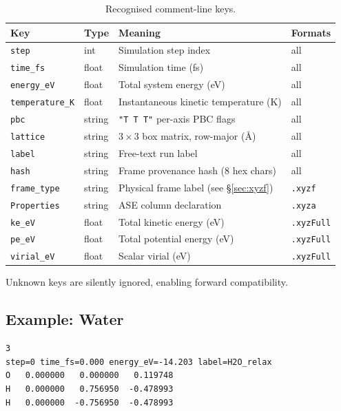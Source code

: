 \documentclass[11pt, a4paper, oneside]{article}
\begin{document}
\begin{table}[h]
\centering
\begin{tabular}{llll}
  \toprule
  Key & Type & Meaning & Formats \\
  \midrule
  \texttt{step}            & int    & Simulation step index & all \\
  \texttt{time\_fs}        & float  & Simulation time (fs)  & all \\
  \texttt{energy\_eV}      & float  & Total system energy (eV) & all \\
  \texttt{temperature\_K}  & float  & Instantaneous kinetic temperature (K) & all \\
  \texttt{pbc}             & string & \texttt{"T T T"} per-axis PBC flags & all \\
  \texttt{lattice}         & string & $3\times3$ box matrix, row-major (\AA) & all \\
  \texttt{label}           & string & Free-text run label & all \\
  \texttt{hash}            & string & Frame provenance hash (8 hex chars) & all \\
  \texttt{frame\_type}     & string & Physical frame label (see \S\ref{sec:xyzf}) & \texttt{.xyzf} \\
  \texttt{Properties}      & string & ASE column declaration & \texttt{.xyza} \\
  \texttt{ke\_eV}          & float  & Total kinetic energy (eV) & \texttt{.xyzFull} \\
  \texttt{pe\_eV}          & float  & Total potential energy (eV) & \texttt{.xyzFull} \\
  \texttt{virial\_eV}      & float  & Scalar virial (eV) & \texttt{.xyzFull} \\
  \bottomrule
\end{tabular}
\caption{Recognised comment-line keys.}
\label{tab:comment_keys}
\end{table}

Unknown keys are silently ignored, enabling forward compatibility.

\subsection{Example: Water}
\label{sec:xyz_example}

\begin{lstlisting}[caption={Minimal water molecule (\texttt{.xyz}).}]
3
step=0 time_fs=0.000 energy_eV=-14.203 label=H2O_relax
O   0.000000   0.000000   0.119748
H   0.000000   0.756950  -0.478993
H   0.000000  -0.756950  -0.478993
\end{lstlisting}
\end{document}
